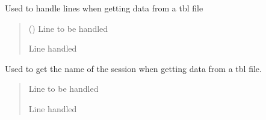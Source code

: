 \documentclass[letterpaper,10pt,english]{sphinxmanual}
\begin{document}

\begin{fulllineitems}
\label{\detokenize{split_data:split_data.converter_split}}
\pysigstartsignatures
{}
\pysigstopsignatures
\sphinxAtStartPar
Used to handle lines when getting data from a tbl file
\begin{quote}\begin{description}
\sphinxAtStartPar
{} () \textendash{} Line to be handled

\sphinxAtStartPar
Line handled

\end{description}\end{quote}

\end{fulllineitems}


\begin{fulllineitems}
\label{\detokenize{split_data:split_data.converter_split_session}}
\pysigstartsignatures
{}
\pysigstopsignatures
\sphinxAtStartPar
Used to get the name of the session when getting data from a tbl file.
\begin{quote}\begin{description}
\sphinxAtStartPar
{} \textendash{} Line to be handled

\sphinxAtStartPar
Line handled

\end{description}\end{quote}

\end{fulllineitems}

\end{document}
